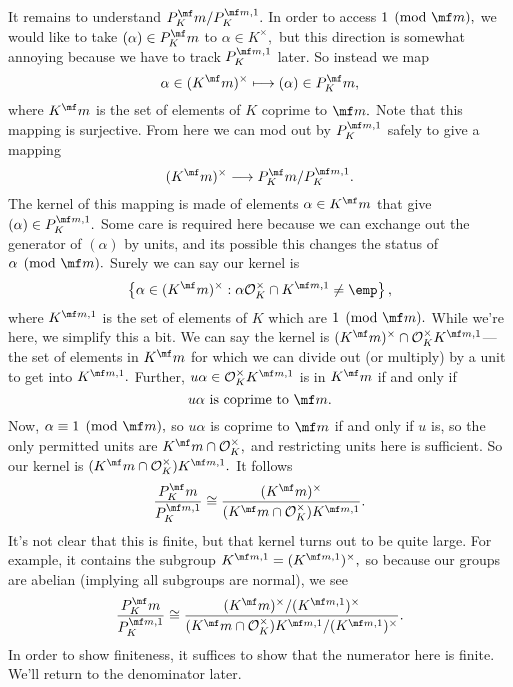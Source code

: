It remains to understand $P_K^\mf m/P_K^{\mf m,1}.$ In order to access $1\pmod{\mf m},$ we would like to take $(\alpha)\in P_K^\mf m$ to $\alpha\in K^\times,$ but this direction is somewhat annoying because we have to track $P_K^{\mf m,1}$ later. So instead we map
\[\alpha\in(K^\mf m)^\times\longmapsto(\alpha)\in P_K^\mf m,\]
where $K^\mf m$ is the set of elements of $K$ coprime to $\mf m.$ Note that this mapping is surjective. From here we can mod out by $P_K^{\mf m,1}$ safely to give a mapping
\[(K^\mf m)^\times\longrightarrow P_K^\mf m/P_K^{\mf m,1}.\]
The kernel of this mapping is made of elements $\alpha\in K^\mf m$ that give $(\alpha)\in P_K^{\mf m,1}.$ Some care is required here because we can exchange out the generator of $(\alpha)$ by units, and its possible this changes the status of $\alpha\pmod{\mf m}.$ Surely we can say our kernel is
\[\left\{\alpha\in(K^\mf m)^\times:\alpha\mathcal O_K^\times\cap K^{\mf m,1}\ne\emp\right\},\]
where $K^{\mf m,1}$ is the set of elements of $K$ which are $1\pmod{\mf m}.$ While we're here, we simplify this a bit. We can say the kernel is $(K^\mf m)^\times\cap\mathcal O_K^\times K^{\mf m,1}$---the set of elements in $K^\mf m$ for which we can divide out (or multiply) by a unit to get into $K^{\mf m,1}.$ Further, $u\alpha\in\mathcal O_K^\times K^{\mf m,1}$ is in $K^\mf m$ if and only if
\[u\alpha\text{ is coprime to }\mf m.\]
Now, $\alpha\equiv1\pmod{\mf m},$ so $u\alpha$ is coprime to $\mf m$ if and only if $u$ is, so the only permitted units are $K^\mf m\cap\mathcal O_K^\times,$ and restricting units here is sufficient. So our kernel is $(K^\mf m\cap\mathcal O_K^\times)K^{\mf m,1}.$ It follows
\[\frac{P_K^\mf m}{P_K^{\mf m,1}}\cong\frac{(K^\mf m)^\times}{(K^\mf m\cap\mathcal O_K^\times)K^{\mf m,1}}.\]
It's not clear that this is finite, but that kernel turns out to be quite large. For example, it contains the subgroup $K^{\mf m,1}=(K^{\mf m,1})^\times,$ so because our groups are abelian (implying all subgroups are normal), we see
\[\frac{P_K^\mf m}{P_K^{\mf m,1}}\cong\frac{(K^\mf m)^\times/(K^{\mf m,1})^\times}{(K^\mf m\cap\mathcal O_K^\times)K^{\mf m,1}/(K^{\mf m,1})^\times}.\]
In order to show finiteness, it suffices to show that the numerator here is finite. We'll return to the denominator later.

